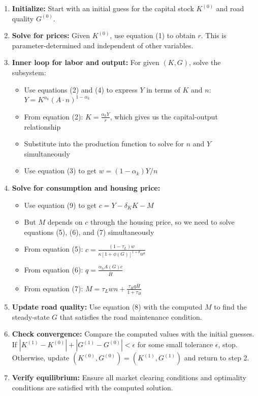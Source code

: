 \begin{enumerate}
    \item \textbf{Initialize:} Start with an initial guess for the capital stock $K^{(0)}$ and road quality $G^{(0)}$.

    \item \textbf{Solve for prices:} Given $K^{(0)}$, use equation (1) to obtain $r$. This is parameter-determined and independent of other variables.

    \item \textbf{Inner loop for labor and output:} For given $(K, G)$, solve the subsystem:
    \begin{itemize}
        \item Use equations (2) and (4) to express $Y$ in terms of $K$ and $n$: $Y = K^{\alpha_k}(A \cdot n)^{1-\alpha_k}$
        \item From equation (2): $K = \frac{\alpha_k Y}{r}$, which gives us the capital-output relationship
        \item Substitute into the production function to solve for $n$ and $Y$ simultaneously
        \item Use equation (3) to get $w = (1-\alpha_k)Y/n$
    \end{itemize}

    \item \textbf{Solve for consumption and housing price:} 
    \begin{itemize}
        \item Use equation (9) to get $c = Y - \delta_K K - M$
        \item But $M$ depends on $c$ through the housing price, so we need to solve equations (5), (6), and (7) simultaneously
        \item From equation (5): $c = \frac{(1-\tau_L)w}{\kappa [1+\phi(G)]^{1+\theta} n^\theta}$
        \item From equation (6): $q = \frac{\alpha_h A(G) c}{\bar{H}}$
        \item From equation (7): $M = \tau_L w n + \frac{\tau_H q \bar{H}}{1+\tau_H}$
    \end{itemize}

    \item \textbf{Update road quality:} Use equation (8) with the computed $M$ to find the steady-state $G$ that satisfies the road maintenance condition.

    \item \textbf{Check convergence:} Compare the computed values with the initial guesses. If $|K^{(1)} - K^{(0)}| + |G^{(1)} - G^{(0)}| < \epsilon$ for some small tolerance $\epsilon$, stop. Otherwise, update $(K^{(0)}, G^{(0)}) = (K^{(1)}, G^{(1)})$ and return to step 2.

    \item \textbf{Verify equilibrium:} Ensure all market clearing conditions and optimality conditions are satisfied with the computed solution.
\end{enumerate}

